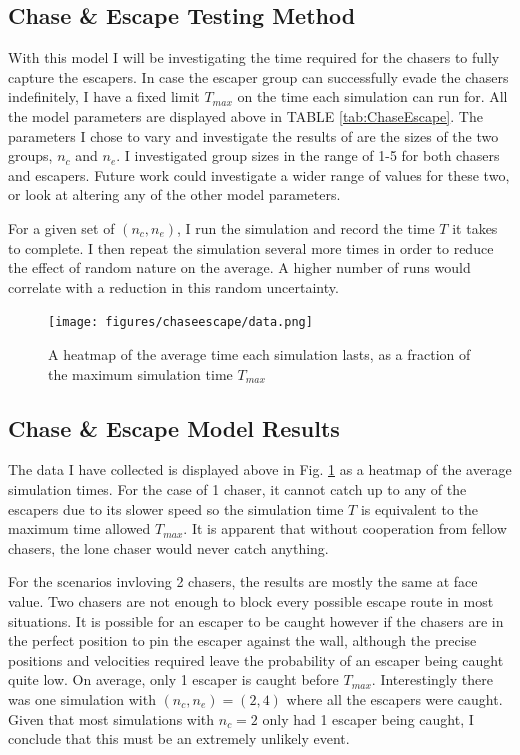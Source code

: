 \documentclass[%
11pt,
amsmath, amssymb,
aps,
pra
]{revtex4-2}
\begin{document}
\subsection{Chase \& Escape Testing Method}
With this model I will be investigating the time required for the chasers to fully capture the escapers. In case the
escaper group can successfully evade the chasers indefinitely, I have a fixed limit \(T_{max}\) on the 
time each simulation can run for. All the model parameters are displayed above in TABLE \ref{tab:ChaseEscape}.
The parameters I chose to vary and investigate the results of are the sizes of the two groups, \(n_c\) and \(n_e\). 
I investigated group sizes in the range of 1-5 for both chasers and escapers. 
Future work could investigate a wider range of values for these two, or look at altering any of the other model parameters.

For a given set of \((n_c,n_e)\), I run the simulation and record the time \(T\) it takes to complete. I then repeat the
simulation several more times in order to reduce the effect of random nature on the average. A higher number of runs 
would correlate with a reduction in this random uncertainty. 




\begin{figure}[t]
    \texttt{[image: figures/chaseescape/data.png]}
    \caption{A heatmap of the average time each simulation lasts, as a fraction of the maximum simulation time \(T_{max}\)}
    \label{fig:chaseescapedata}
\end{figure}
\subsection{Chase \& Escape Model Results}
The data I have collected is displayed above in Fig. \ref{fig:chaseescapedata} as a heatmap of the average simulation
times. For the case of 1 chaser, it cannot catch up to any of the escapers due to its slower speed so the simulation time
\(T\) is equivalent to the maximum time allowed \(T_{max}\). It is apparent that without cooperation from fellow chasers,
the lone chaser would never catch anything.

For the scenarios invloving 2 chasers, the results are mostly the same at face value. Two chasers are not enough to block
every possible escape route in most situations. It is possible for an escaper to be caught however if the chasers are in
the perfect position to pin the escaper against the wall, although the precise positions and velocities required leave the
probability of an escaper being caught quite low. On average, only 1 escaper is caught before \(T_{max}\). Interestingly
there was one simulation with \((n_c,n_e) = (2,4)\) where all the escapers were caught. Given that most simulations
with \(n_c=2\) only had 1 escaper being caught, I conclude that this must be an extremely unlikely event.
\end{document}
